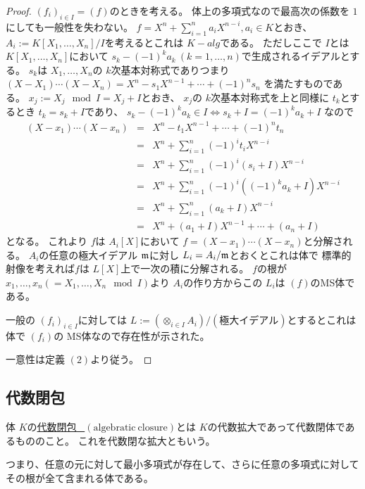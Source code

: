 \documentclass[../master_galois_theory]{subfiles}
\begin{document}
\begin{proof}
  $(f_i)_{i \in I} = (f)$のときを考える。
  体上の多項式なので最高次の係数を $1$にしても一般性を失わない。
  $f = X^n + \sum_{i = 1}^n a_i X^{n-i} , a_i \in K$とおき、
  $A_i := K[X_1 , \dots , X_n]/ I$を考えるとこれは $K-alg$である。
  ただしここで $I$とは $K[X_1 , \dots , X_n]$において
  $s_k - (-1)^k a_k \  (k = 1 , \dots , n)$で生成されるイデアルとする。
  $s_k$は $X_1 , \dots , X_n$の $k$次基本対称式でありつまり
  $(X - X_1) \cdots (X - X_n) = X^n - s_1 X^{n-1} + \cdots + (-1)^n s_n$
  を満たすものである。
  $x_j := X_j \mod I = X_j + I$とおき、 $x_j$の $k$次基本対称式を上と同様に $t_k$とするとき
  $t_k = s_k + I$であり、
  $s_k - (-1)^k a_k \in I \Leftrightarrow s_k + I = (-1)^k a_k + I$
  なので
  \begin{eqnarray*}
    (X - x_1) \cdots (X - x_n) & = & X^n - t_1 X^{n-1} + \cdots + (-1)^n t_n \\
    & = & X^n + \sum_{i=1}^n (-1)^i t_i X^{n-i} \\
    & = & X^n + \sum_{i=1}^n (-1)^i (s_i + I) X^{n-i} \\
    & = & X^n + \sum_{i=1}^n (-1)^i ((-1)^k a_k + I) X^{n-i} \\
    & = & X^n + \sum_{i=1}^n (a_k + I) X^{n-i} \\
    & = & X^n + (a_1 + I) X^{n-1} + \cdots + (a_n + I)
  \end{eqnarray*}
  となる。
  これより $f$は $A_i[X]$において $f = (X - x_1) \cdots (X - x_n)$と分解される。
  $A_i$の任意の極大イデアル $\mathfrak{m}$に対し $L_i = A_i/\mathfrak{m}$とおくとこれは体で
  標準的射像を考えれば$f$は $L[X]$上で一次の積に分解される。
  $f$の根が $x_1 , \dots , x_n (= X_1 , \dots , X_n \mod I)$より
  $A_i$の作り方からこの $L_i$は $(f)$の\rm{MS}体である。

  一般の $(f_i)_{i \in I}$に対しては
  $L := (\otimes_{i \in I} A_i) / (極大イデアル)$とするとこれは体で
  $(f_i)$の \rm{MS}体なので存在性が示された。

  一意性は定義 $(2)$より従う。
\end{proof}

\subsection{代数閉包}

\begin{defi}
  体 $K$の\underline{代数閉包 \  $(\mathrm{algebratic \  closure})$}とは
  $K$の代数拡大であって代数閉体であるもののこと。
  これを代数閉な拡大ともいう。

  つまり、任意の元に対して最小多項式が存在して、さらに任意の多項式に対してその根が全て含まれる体である。
\end{defi}
\end{document}
